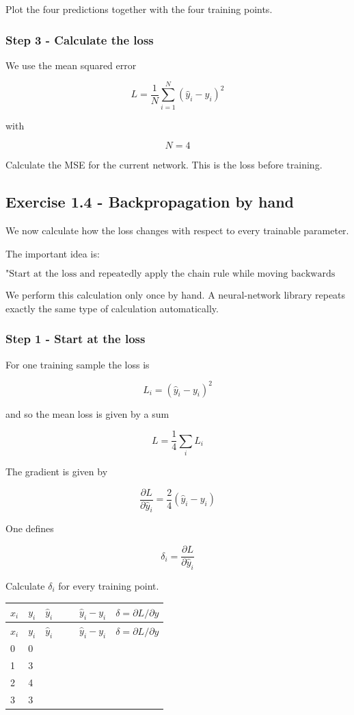 \documentclass{course_sheet}
\begin{document}
Plot the four predictions together with the four training points.

\subsubsection*{Step 3 - Calculate the loss}
We use the mean squared error

\[
L=\frac{1}{N}\sum_{i=1}^{N}(\hat y_i-y_i)^2
\]

with

\[
N=4
\]

Calculate the MSE for the current network. This is the loss before training.

\subsection*{Exercise 1.4 - Backpropagation by hand}
We now calculate how the loss changes with respect to every trainable parameter.

The important idea is:

\[
\text{"Start at the loss and repeatedly apply the chain rule while moving backwards through the network"}
\]

We perform this calculation only once by hand. A neural-network library repeats exactly the same type of calculation automatically.

\subsubsection*{Step 1 - Start at the loss}
For one training sample the loss is

\[
L_i=(\hat y_i-y_i)^2
\]

and so the mean loss is given by a sum

\[
L=\frac{1}{4}\sum_i L_i
\]

The gradient is given by

\[
\frac{\partial L}{\partial \hat y_i}=\frac{2}{4}(\hat y_i-y_i)
\]

One defines

\[
\delta_i=\frac{\partial L}{\partial \hat y_i}
\]

Calculate $\delta_i$ for every training point.

\begingroup
\small
\setlength{\tabcolsep}{4pt}
\begin{longtable}{l|l|l|l|l}
$x_i$ & $y_i$ & $\hat y_i$ & $\hat y_i-y_i$ & $\delta=\partial L/\partial\hat y$ \\[1.5pt]
\hline
\endfirsthead
$x_i$ & $y_i$ & $\hat y_i$ & $\hat y_i-y_i$ & $\delta=\partial L/\partial\hat y$ \\[1.5pt]
\hline
\endhead
\rule{0pt}{2.4ex}0 & 0 &  $\phantom{-0.00}$ &  $\phantom{-0.00}$ &  $\phantom{-0.00}$ \\[3pt]
\rule{0pt}{2.4ex}1 & 3 &  $\phantom{-0.00}$ &  $\phantom{-0.00}$ &  $\phantom{-0.00}$ \\[3pt]
\rule{0pt}{2.4ex}2 & 4 &  $\phantom{-0.00}$ &  $\phantom{-0.00}$ &  $\phantom{-0.00}$ \\[3pt]
\rule{0pt}{2.4ex}3 & 3 &  $\phantom{-0.00}$ &  $\phantom{-0.00}$ &  $\phantom{-0.00}$ \\[3pt]
\end{longtable}
\endgroup
\end{document}
